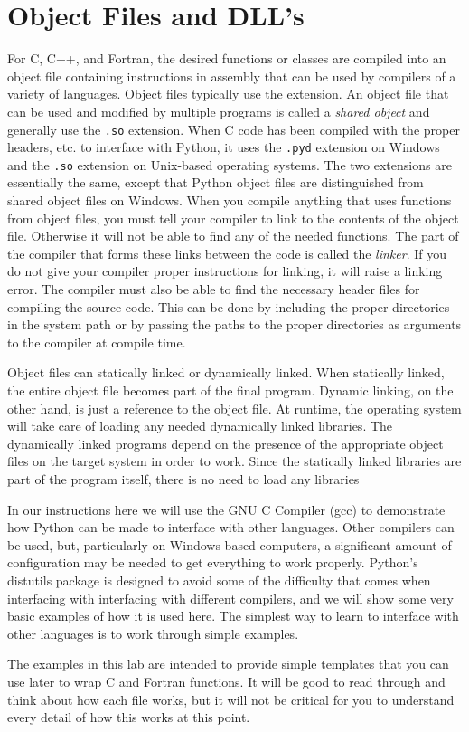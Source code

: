 \section*{Object Files and DLL's}
For C, C++, and Fortran, the desired functions or classes are compiled into an object file containing instructions in assembly that can be used by compilers of a variety of languages.
Object files typically use the \of extension.
An object file that can be used and modified by multiple programs is called a \emph{shared object} and generally use the \texttt{.so} extension.
When C code has been compiled with the proper headers, etc. to interface with Python, it uses the \texttt{.pyd} extension on Windows and the \texttt{.so} extension on Unix-based operating systems.
The two extensions are essentially the same, except that Python object files are distinguished from shared object files on Windows.
When you compile anything that uses functions from object files, you must tell your compiler to link to the contents of the object file.
Otherwise it will not be able to find any of the needed functions.
The part of the compiler that forms these links between the code is called the \emph{linker}.
If you do not give your compiler proper instructions for linking, it will raise a linking error.
The compiler must also be able to find the necessary header files for compiling the source code.
This can be done by including the proper directories in the system path or by passing the paths to the proper directories as arguments to the compiler at compile time.

Object files can statically linked or dynamically linked.
When statically linked, the entire object file becomes part of the final program.
Dynamic linking, on the other hand, is just a reference to the object file.
At runtime, the operating system will take care of loading any needed dynamically linked libraries.
The dynamically linked programs depend on the presence of the appropriate object files on the target system in order to work.
Since the statically linked libraries are part of the program itself, there is no need to load any libraries

In our instructions here we will use the GNU C Compiler (gcc) to demonstrate how Python can be made to interface with other languages.
Other compilers can be used, but, particularly on Windows based computers, a significant amount of configuration may be needed to get everything to work properly.
Python's distutils package is designed to avoid some of the difficulty that comes when interfacing with interfacing with different compilers, and we will show some very basic examples of how it is used here.
The simplest way to learn to interface with other languages is to work through simple examples.
\begin{info}
The examples in this lab are intended to provide simple templates that you can use later to wrap C and Fortran functions.
It will be good to read through and think about how each file works, but it will not be critical for you to understand every detail of how this works at this point.
\end{info}

